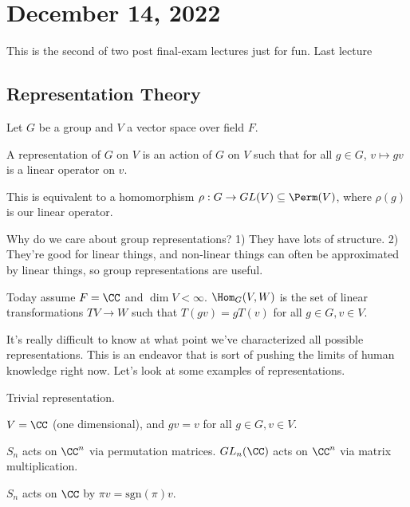 \section{December 14, 2022}

This is the second of two post final-exam lectures just for fun. Last lecture

\subsection{Representation Theory}

Let $G$ be a group and $V$ a vector space over field $F$. 

\begin{definition}

A \ac{representation} of $G$ on $V$ is an action of $G$ on $V$ such that for all $g\in G$, $v\mapsto gv$ is a linear operator on $v$.
\end{definition}
This is equivalent to a homomorphism $\rho : G\rightarrow GL(V) \subseteq \Perm(V)$, where $\rho(g)$ is our linear operator.

Why do we care about group representations? 1) They have lots of structure. 2) They're good for linear things, and non-linear things can often be approximated by linear things, so group representations are useful. 

Today assume $F = \CC$ and $\dim V < \infty$. $\Hom_G(V,W)$ is the set of linear transformations $TV\rightarrow W$ such that $T(gv) = gT(v)$ for all $g\in G, v\in V$. 

It's really difficult to know at what point we've characterized all possible representations. This is an endeavor that is sort of pushing the limits of human knowledge right now. Let's look at some examples of representations. 

\begin{example}
\exlabel

Trivial representation.
\end{example}

$V = \CC$ (one dimensional), and $gv=v$ for all $g\in G, v\in V$. 

\begin{example}
\exlabel

$S_n$ acts on $\CC^n$ via permutation matrices. \newline
$GL_n(\CC)$ acts on $\CC^n$ via matrix multiplication. 
\end{example}

\begin{example}
\exlabel

$S_n$ acts on $\CC$ by $\pi v = \text{sgn}(\pi) v$. 
\end{example}

